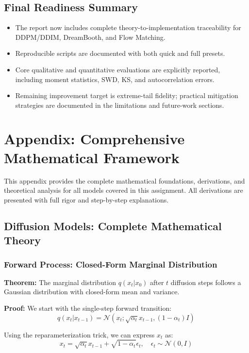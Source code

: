 \documentclass[a4paper,12pt]{article}
\begin{document}
\subsection{Final Readiness Summary}
\begin{itemize}
    \item The report now includes complete theory-to-implementation traceability for DDPM/DDIM, DreamBooth, and Flow Matching.
    \item Reproducible scripts are documented with both quick and full presets.
    \item Core qualitative and quantitative evaluations are explicitly reported, including moment statistics, SWD, KS, and autocorrelation errors.
    \item Remaining improvement target is extreme-tail fidelity; practical mitigation strategies are documented in the limitations and future-work sections.
\end{itemize}
\clearpage
\section{Appendix: Comprehensive Mathematical Framework}

This appendix provides the complete mathematical foundations, derivations, and theoretical analysis for all models covered in this assignment. All derivations are presented with full rigor and step-by-step explanations.

\subsection{Diffusion Models: Complete Mathematical Theory}

\subsubsection{Forward Process: Closed-Form Marginal Distribution}

\textbf{Theorem:} The marginal distribution $q(x_t | x_0)$ after $t$ diffusion steps follows a Gaussian distribution with closed-form mean and variance.

\textbf{Proof:} We start with the single-step forward transition:
\begin{equation}
q(x_t | x_{t-1}) = \mathcal{N}(x_t; \sqrt{\alpha_t} x_{t-1}, (1 - \alpha_t) I)
\label{eq:single_step}
\end{equation}

Using the reparameterization trick, we can express $x_t$ as:
\begin{equation}
x_t = \sqrt{\alpha_t} x_{t-1} + \sqrt{1 - \alpha_t} \epsilon_t, \quad \epsilon_t \sim \mathcal{N}(0, I)
\label{eq:reparam_t}
\end{equation}
\end{document}
